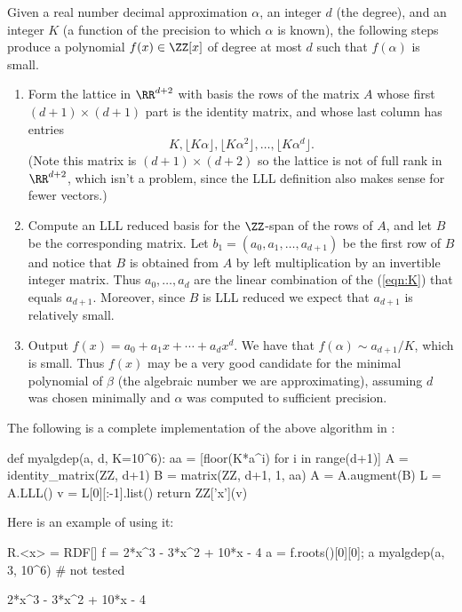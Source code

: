 Given a real number decimal approximation $\alpha$, an
integer $d$ (the degree), and an integer $K$ (a function
of the precision to which $\alpha$ is known), the following
steps produce a polynomial $f(x) \in \ZZ[x]$ of degree
at most $d$ such that $f(\alpha)$ is small.
\begin{enumerate}
  \item Form the lattice in $\RR^{d+2}$ with basis the rows
  of the matrix $A$ whose first $(d+1) \times (d+1)$ part is the
  identity matrix, and whose last column has entries
  \begin{equation}\label{eqn:K}
    K, \lfloor K\alpha \rfloor, \lfloor K\alpha^2 \rfloor,
    \dots, \lfloor K\alpha^{d} \rfloor.
  \end{equation}
  (Note this matrix is $(d+1) \times (d+2)$ so the lattice
  is not of full rank in $\RR^{d+2}$, which isn't a problem,
  since the LLL definition also makes sense for fewer vectors.)

  \item Compute an LLL reduced basis for the $\ZZ$-span of the rows
  of $A$, and let $B$ be the corresponding matrix.
  Let $b_1 = (a_0, a_1, \dots, a_{d+1})$ be the first
  row of $B$ and notice that $B$ is obtained from $A$
  by left multiplication by an invertible integer matrix.
  Thus $a_0,\dots, a_d$ are the linear combination of the
  (\ref{eqn:K}) that equals $a_{d+1}$. Moreover, since $B$
  is LLL reduced we expect that $a_{d+1}$ is relatively small.

  \item Output $f(x) = a_0 + a_1 x + \cdots + a_{d} x^d$.
  We have that $f(\alpha) \sim a_{d+1}/K$, which is small.
  Thus $f(x)$ may be a very good candidate for the minimal
  polynomial of $\beta$ (the algebraic number we are approximating),
  assuming $d$ was chosen minimally and $\alpha$ was computed
  to sufficient precision.
\end{enumerate}

The following is a complete implementation of the above algorithm
in {\Sage}:
\begin{sagecode}
\begin{sagecell}
def myalgdep(a, d, K=10^6):
    aa = [floor(K*a^i) for i in range(d+1)]
    A = identity_matrix(ZZ, d+1)
    B = matrix(ZZ, d+1, 1, aa)
    A = A.augment(B)
    L = A.LLL()
    v = L[0][:-1].list()
    return ZZ['x'](v)
\end{sagecell}
\end{sagecode}

Here is an example of using it:
\begin{sagecode}
\begin{sagecell}
R.<x> = RDF[]
f = 2*x^3 - 3*x^2 + 10*x - 4
a = f.roots()[0][0]; a
myalgdep(a, 3, 10^6)       # not tested
\end{sagecell}
\begin{sageout}
2*x^3 - 3*x^2 + 10*x - 4
\end{sageout}
\end{sagecode}
